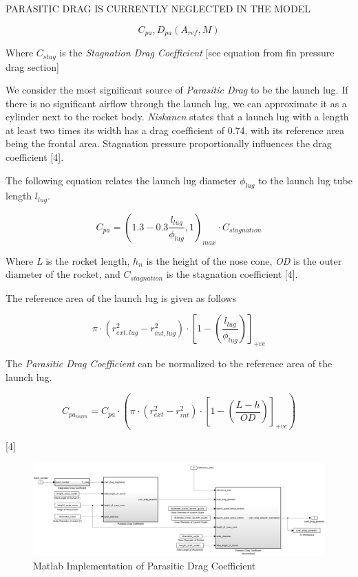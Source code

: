 \documentclass[]{book}
\begin{document}
PARASITIC DRAG IS CURRENTLY NEGLECTED IN THE MODEL

\begin{equation}
C_{pa}, D_{pa} (A_{ref}, M) 
\end{equation}

Where \(C_{stag}\) is the \emph{Stagnation Drag Coefficient} {[}see
equation from fin pressure drag section{]}

We consider the most significant source of \emph{Parasitic Drag} to be
the launch lug. If there is no significant airflow through the launch
lug, we can approximate it as a cylinder next to the rocket body.
\emph{Niskanen} states that a launch lug with a length at least two
times its width has a drag coefficient of 0.74, with its reference area
being the frontal area. Stagnation pressure proportionally influences
the drag coefficient {[}4{]}.

The following equation relates the launch lug diameter \(\phi_{lug}\) to
the launch lug tube length \(l_{lug}\).

\begin{equation}
C_{pa} = \left( 1.3 - 0.3 \dfrac{l_{lug}}{\phi_{lug}} , 1 \right)_{max} \cdot C_{stagnation} 
\end{equation}

Where \emph{L} is the rocket length, \(h_n\) is the height of the nose
cone, \emph{OD} is the outer diameter of the rocket, and
\(C_{stagnation}\) is the stagnation coefficient {[}4{]}.

The reference area of the launch lug is given as follows

\begin{equation}
\label{eq_area_reference_launch_lug}
\pi \cdot (r_{ext,lug}^2 - r_{int,lug}^2) \cdot 
\left[ 1 - \left( \dfrac{l_{lug}}{\phi_{lug}} \right) \right]_{+ve} 
\end{equation}

The \emph{Parasitic Drag Coefficient} can be normalized to the reference
area of the launch lug.

\begin{equation}
\label{eq_coef_drag_parasitic_normalized}
C_{pa_{norm}} = 
C_{pa} \cdot 
\left( 
\pi \cdot (r_{ext}^2 - r_{int}^2) \cdot 
\left[ 1 - \left( \dfrac{L-h}{OD} \right)  \right]_{+ve} 
\right) 
\end{equation}

{[}4{]}

\begin{figure}[htbp]
\centering
\includegraphics{images/drag/coef_drag_parasitic.png}
\caption{Matlab Implementation of Parasitic Drag
Coefficient\label{img_coef_drag_parasitic_label}}
\end{figure}
\end{document}

